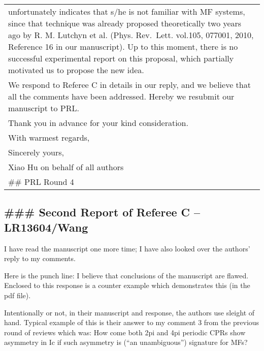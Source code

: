 \documentclass[11pt]{article}
\begin{document}
\begin{longtable}[]{@{}l@{}}
\begin{minipage}[t]{0.96\columnwidth}
unfortunately indicates that s/he is not familiar with MF systems, since
that technique was already proposed theoretically two years ago by R. M.
Lutchyn et al. (Phys. Rev.~Lett. vol.105, 077001, 2010, Reference 16 in
our manuscript). Up to this moment, there is no successful experimental
report on this proposal, which partially motivated us to propose the new
idea.\strut
\end{minipage}\tabularnewline
\begin{minipage}[t]{0.96\columnwidth}\raggedright
We respond to Referee C in details in our reply, and we believe that all
the comments have been addressed. Hereby we resubmit our manuscript to
PRL.\strut
\end{minipage}\tabularnewline
\begin{minipage}[t]{0.96\columnwidth}\raggedright
Thank you in advance for your kind consideration.\strut
\end{minipage}\tabularnewline
\begin{minipage}[t]{0.96\columnwidth}\raggedright
With warmest regards,\strut
\end{minipage}\tabularnewline
\begin{minipage}[t]{0.96\columnwidth}\raggedright
Sincerely yours,\strut
\end{minipage}\tabularnewline
\begin{minipage}[t]{0.96\columnwidth}\raggedright
Xiao Hu on behalf of all authors\strut
\end{minipage}\tabularnewline
\begin{minipage}[t]{0.96\columnwidth}\raggedright
\#\# PRL Round 4\strut
\end{minipage}\tabularnewline
\bottomrule
\end{longtable}

\hypertarget{second-report-of-referee-c-lr13604wang}{%
\subsection{\#\#\# Second Report of Referee C --
LR13604/Wang}\label{second-report-of-referee-c-lr13604wang}}

I have read the manuscript one more time; I have also looked over the
authors' reply to my comments.

Here is the punch line: I believe that conclusions of the manuscript are
flawed. Enclosed to this response is a counter example which
demonstrates this (in the pdf file).

Intentionally or not, in their manuscript and response, the authors use
sleight of hand. Typical example of this is their answer to my comment 3
from the previous round of reviews which was: How come both 2pi and 4pi
periodic CPRs show asymmetry in Ic if such asymmetry is (``an
unambiguous'') signature for MFs?
\end{document}
